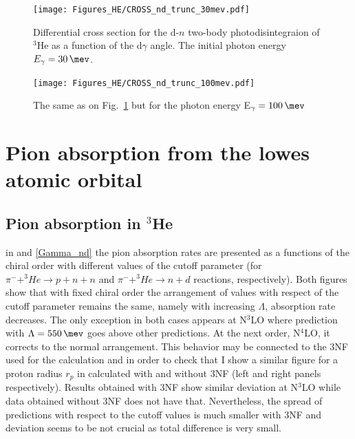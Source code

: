 \begin{figure}[h]
    \begin{center}
        \texttt{[image: Figures\_HE/CROSS\_nd\_trunc\_30mev.pdf]}
        \end{center}
        \caption{Differential cross section for the d-$n$ 
        two-body photodisintegraion of $^3$He as a function of the d$\gamma$ angle.
        The initial photon energy $E_\gamma=\SI{30}{\mev}$.}
        \label{CROSS_nd_30}
    \end{figure}


    \begin{figure}[h]
        \begin{center}
        \texttt{[image: Figures\_HE/CROSS\_nd\_trunc\_100mev.pdf]}
        \end{center}
        \caption{The same as on Fig.~\ref{CROSS_nd_30} but 
        for the photon energy E$_\gamma=\SI{100}{\mev}$}
        \label{CROSS_nd_100}
    \end{figure}

    \clearpage
    \section{Pion absorption from the lowes atomic orbital}

    \subsection{Pion absorption in $^3$He}

    in  and \ref{Gamma_nd} the pion absorption rates are presented as a functions
    of the chiral order with different values of the cutoff parameter
    (for $\pi^- + ^3He \rightarrow p + n + n$ and $\pi^- + ^3He \rightarrow n + d$ reactions, respectively).
    Both figures show that with fixed chiral order the arrangement of values with respect of the cutoff parameter
    remains the same, namely with increasing $\Lambda$, absorption rate decreases. The only exception in both cases 
    appears at N$^3$LO where prediction with $\Lambda = \SI{550}{\mev}$ goes above other predictions.
    At the next order, N$^4$LO, it corrects to the normal arrangement.
    This behavior may be connected to the 3NF used for the calculation and in order to check that I show
    a similar figure for a proton radius $r_p$ in  calculated with 
    and without 3NF (left and right panels respectively). Results obtained with 3NF show
    similar deviation at N$^3$LO while data obtained without 3NF does not have that.
    Nevertheless, the spread of predictions with respect to the cutoff values is much smaller
    with 3NF and deviation seems to be not crucial as total difference is very small.




